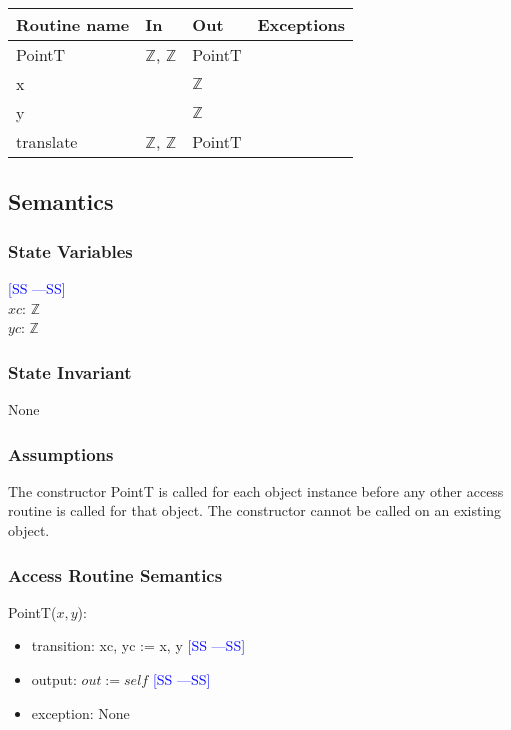 \documentclass[12pt]{article}
\newcommand{\authornote}[3]{\textcolor{#1}{[#3 ---#2]}}
\newcommand{\authornote}[3]{}
\newcommand{\wss}[1]{\authornote{blue}{SS}{#1}}
\begin{document}
\begin{tabular}{| l | l | l | l |}
\hline
\textbf{Routine name} & \textbf{In} & \textbf{Out} & \textbf{Exceptions}\\
\hline
PointT & $\mathbb{Z}$, $\mathbb{Z}$ & PointT & \\
\hline
x & ~ & $\mathbb{Z}$ & ~\\
\hline
y & ~ & $\mathbb{Z}$ & ~\\
\hline
translate & $\mathbb{Z}$, $\mathbb{Z}$ & PointT & ~\\
\hline
\end{tabular}

\subsection* {Semantics}

\subsubsection* {State Variables}
\wss{SS}\\
$xc$: $\mathbb{Z}$\\ 
$yc$: $\mathbb{Z}$

\subsubsection* {State Invariant}

None

\subsubsection* {Assumptions}

The constructor PointT is called for each object instance before any other
access routine is called for that object.  The constructor cannot be called on
an existing object.

\subsubsection* {Access Routine Semantics}

PointT($x, y$):
\begin{itemize}
\item transition: xc, yc := x, y  \wss{SS}
\item output: $out := \mathit{self}$ \wss{SS}
\item exception: None 
\end{itemize}
\end{document}
